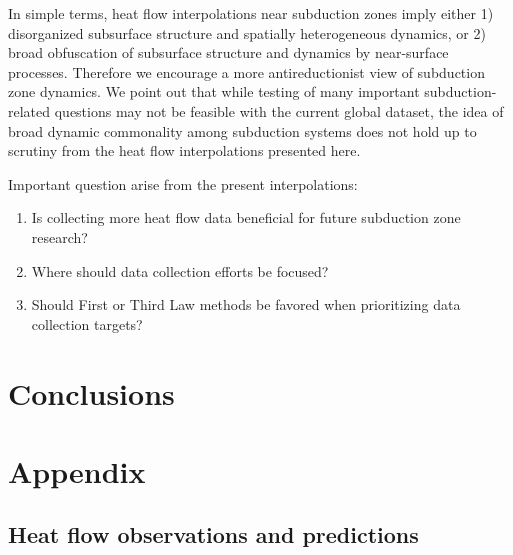 \documentclass[draft,linenumbers]{agujournal2018}
\begin{document}
In simple terms, heat flow interpolations near subduction zones imply
either 1) disorganized subsurface structure and spatially heterogeneous
dynamics, or 2) broad obfuscation of subsurface structure and dynamics
by near-surface processes. Therefore we encourage a more
antireductionist view of subduction zone dynamics. We point out that
while testing of many important subduction-related questions may not be
feasible with the current global dataset, the idea of broad dynamic
commonality among subduction systems does not hold up to scrutiny from
the heat flow interpolations presented here.

Important question arise from the present interpolations:

\begin{enumerate}
\def\labelenumi{\arabic{enumi}.}
\item
  Is collecting more heat flow data beneficial for future subduction
  zone research?
\item
  Where should data collection efforts be focused?
\item
  Should First or Third Law methods be favored when prioritizing data
  collection targets?
\end{enumerate}

\section{Conclusions}

\acknowledgments

\section*{Appendix}

\hypertarget{sec:comps}{%
\subsection*{Heat flow observations and predictions}\label{sec:comps}}
\end{document}
